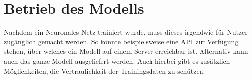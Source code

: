 \section{Betrieb des Modells}\label{sec:betrieb}

Nachdem ein Neuronales Netz trainiert wurde, muss dieses irgendwie für Nutzer zugänglich gemacht werden.
So könnte beispielsweise eine API zur Verfügung stehen, über welches ein Modell auf einem Server erreichbar ist.
Alternativ kann auch das ganze Modell ausgeliefert werden.
Auch hierbei gibt es zusätzlich Möglichkeiten, die Vertraulichkeit der Trainingsdaten zu schützen.

% 
% 
% 
% 

